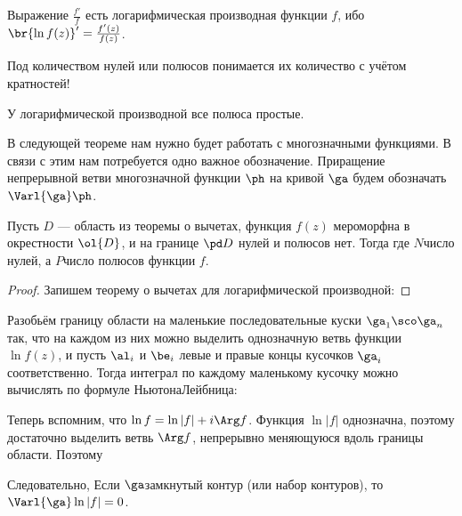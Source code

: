 \documentclass[a4paper]{article}
\begin{document}
\begin{note}
Выражение $\frac{f'}{f}$ есть логарифмическая производная функции $f$, ибо $\br{\ln f(z)}' = \frac{f'(z)}{f(z)}$.
\end{note}

\begin{note}
Под количеством нулей или полюсов понимается их количество с учётом кратностей!
\end{note}

\begin{note}
У логарифмической производной все полюса простые.
\end{note}

В следующей теореме нам нужно будет работать с многозначными функциями. В связи с этим нам потребуется одно важное
обозначение. Приращение непрерывной ветви многозначной функции $\ph$ на кривой $\ga$ будем обозначать $\Varl{\ga}\ph$.

\begin{theorem}
Пусть $D$ --- область из теоремы о вычетах, функция $f(z)$ мероморфна в окрестности $\ol{D}$, и на границе
$\pd D$ нулей и полюсов нет. Тогда
где $N$\т число нулей, а $P$\т число полюсов функции $f$.
\end{theorem}
\begin{proof}
Запишем теорему о вычетах для логарифмической производной:
\hfill\end{proof}

Разобьём границу области на маленькие последовательные
куски $\ga_1 \sco \ga_n$ так, что
на каждом из них можно выделить однозначную ветвь функции $\ln f(z)$, и пусть $\al_i$ и $\be_i$\т
левые и правые концы кусочков $\ga_i$ соответственно. Тогда интеграл по каждому маленькому кусочку
можно вычислять по формуле Ньютона\ч Лейбница:

Теперь вспомним, что $\ln f = \ln |f| + i \Arg f$. Функция $\ln |f|$ однозначна, поэтому достаточно выделить
ветвь $\Arg f$, непрерывно меняющуюся вдоль границы области. Поэтому

Следовательно,
Если $\ga$\т замкнутый контур (или набор контуров), то $\Varl{\ga}\ln|f|=0$.
\end{document}
